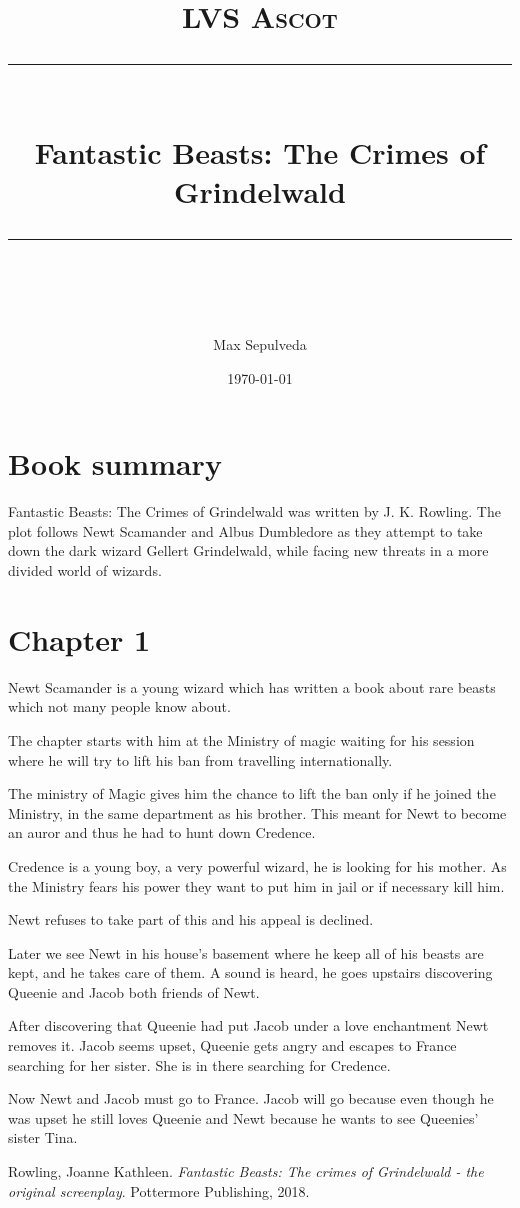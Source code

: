 \documentclass[11pt]{scrartcl} %
\title{	
	\normalfont\normalsize
	\textsc{LVS Ascot}\\ %
	\vspace{25pt} %
	\rule{\linewidth}{0.5pt}\\ %
	\vspace{20pt} %
	{\huge Fantastic Beasts: The Crimes of Grindelwald}\\ %
	\vspace{12pt} %
	\rule{\linewidth}{2pt}\\ %
	\vspace{12pt} %
}
\author{\LARGE Max Sepulveda} %
\date{\normalsize\today} %
\begin{document}
\maketitle %


\section{Book summary}

Fantastic Beasts: The Crimes of Grindelwald was written by J. K. Rowling. The plot follows Newt Scamander and Albus Dumbledore as they attempt to take down the dark wizard Gellert Grindelwald, while facing new threats in a more divided world of wizards.


\section{Chapter 1}

Newt Scamander is a young wizard which has written a book about rare beasts which not many people know about.

The chapter starts with him at the Ministry of magic waiting for his session where he will try to lift his ban from travelling internationally.

The ministry of Magic gives him the chance to lift the ban only if he joined the Ministry, in the same department as his brother. This meant for Newt to become an auror and thus he had to hunt down Credence.

Credence is a young boy, a very powerful wizard, he is looking for his mother. As the Ministry fears his power they want to put him in jail or if necessary kill him.

Newt refuses to take part of this and his appeal is declined.

Later we see Newt in his house's basement where he keep all of his beasts are kept, and he takes care of them. A sound is heard, he goes upstairs discovering Queenie and Jacob both friends of Newt.

After discovering that Queenie had put Jacob under a love enchantment Newt removes it. Jacob seems upset, Queenie gets angry and escapes to France searching for her sister. She is in there searching for Credence.

Now Newt and Jacob must go to France. Jacob will go because even though he was upset he still loves Queenie and Newt because he wants to see Queenies' sister Tina.


\begin{thebibliography}{99}

Rowling, Joanne Kathleen. 
\textit{Fantastic Beasts: The crimes of Grindelwald - the original screenplay}. 
Pottermore Publishing, 2018.

\end{thebibliography}
\end{document}
